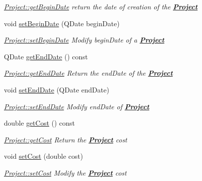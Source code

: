 \begin{DoxyCompactItemize}
\begin{DoxyCompactList}\small\item\em \hyperlink{classModels_1_1Project_a31b8e46aabb1327499f7e36f170900e3}{Project\+::get\+Begin\+Date} return the date of creation of the {\bfseries \hyperlink{classModels_1_1Project}{Project}} \end{DoxyCompactList}\item 
void \hyperlink{classModels_1_1Project_a07dfb00cbec7442197a91bc0795ab14d}{set\+Begin\+Date} (Q\+Date begin\+Date)
\begin{DoxyCompactList}\small\item\em \hyperlink{classModels_1_1Project_a07dfb00cbec7442197a91bc0795ab14d}{Project\+::set\+Begin\+Date} Modify {\itshape begin\+Date} of a {\bfseries \hyperlink{classModels_1_1Project}{Project}} \end{DoxyCompactList}\item 
Q\+Date \hyperlink{classModels_1_1Project_aaf6792d15dcd65c3708e4a01b80e3108}{get\+End\+Date} () const 
\begin{DoxyCompactList}\small\item\em \hyperlink{classModels_1_1Project_aaf6792d15dcd65c3708e4a01b80e3108}{Project\+::get\+End\+Date} Return the {\itshape end\+Date} of the {\bfseries \hyperlink{classModels_1_1Project}{Project}} \end{DoxyCompactList}\item 
void \hyperlink{classModels_1_1Project_a89e9603b862d0a282e4eb03e122e8c05}{set\+End\+Date} (Q\+Date end\+Date)
\begin{DoxyCompactList}\small\item\em \hyperlink{classModels_1_1Project_a89e9603b862d0a282e4eb03e122e8c05}{Project\+::set\+End\+Date} Modify {\itshape end\+Date} of {\bfseries \hyperlink{classModels_1_1Project}{Project}} \end{DoxyCompactList}\item 
double \hyperlink{classModels_1_1Project_a6ad25c30f89821cd988a7ae92d84b41b}{get\+Cost} () const 
\begin{DoxyCompactList}\small\item\em \hyperlink{classModels_1_1Project_a6ad25c30f89821cd988a7ae92d84b41b}{Project\+::get\+Cost} Return the {\bfseries \hyperlink{classModels_1_1Project}{Project}} {\itshape cost} \end{DoxyCompactList}\item 
void \hyperlink{classModels_1_1Project_a840437ed81c595608bd285cac4065082}{set\+Cost} (double cost)
\begin{DoxyCompactList}\small\item\em \hyperlink{classModels_1_1Project_a840437ed81c595608bd285cac4065082}{Project\+::set\+Cost} Modify the {\bfseries \hyperlink{classModels_1_1Project}{Project}} {\itshape cost} \end{DoxyCompactList}\item 

\end{DoxyCompactItemize}
